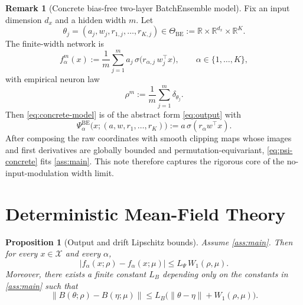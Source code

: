 \documentclass[11pt]{article}
\newtheorem{proposition}[theorem]{Proposition}
\theoremstyle{definition}
\newtheorem{remark}[theorem]{Remark}
\newcommand{\R}{\mathbb{R}}
\newcommand{\W}{W_1}
\begin{document}
\begin{remark}[Concrete bias-free two-layer BatchEnsemble model]
\label{rem:concrete}
Fix an input dimension $d_x$ and a hidden width $m$. Let
\[
  \theta_j=(a_j,w_j,r_{1,j},\dots,r_{K,j})
  \in
  \Theta_{\mathrm{BE}}
  :=
  \R\times\R^{d_x}\times\R^K.
\]
The finite-width network is
\begin{equation}
  f_\alpha^m(x)
  :=
  \frac1m\sum_{j=1}^m
  a_j\,\sigma\!\bigl(r_{\alpha,j}\,w_j^\top x\bigr),
  \qquad
  \alpha\in\{1,\dots,K\},
  \label{eq:concrete-model}
\end{equation}
with empirical neuron law
\[
  \rho^m:=\frac1m\sum_{j=1}^m\delta_{\theta_j}.
\]
Then \eqref{eq:concrete-model} is of the abstract form \eqref{eq:output} with
\begin{equation}
  \Psi_\alpha^{\mathrm{BE}}
  \bigl(x;(a,w,r_1,\dots,r_K)\bigr)
  :=
  a\,\sigma(r_\alpha w^\top x).
  \label{eq:psi-concrete}
\end{equation}
After composing the raw coordinates with smooth clipping maps whose images and
first derivatives are globally bounded and permutation-equivariant,
\eqref{eq:psi-concrete} fits \cref{ass:main}. This note therefore captures the
rigorous core of the no-input-modulation width limit.
\end{remark}

\section{Deterministic Mean-Field Theory}

\begin{proposition}[Output and drift Lipschitz bounds]
\label{prop:lipschitz}
Assume \cref{ass:main}. Then for every $x\in\mathcal X$ and every $\alpha$,
\begin{equation}
  |f_\alpha(x;\rho)-f_\alpha(x;\mu)|
  \le
  L_\Psi\,\W(\rho,\mu).
  \label{eq:out-lip}
\end{equation}
Moreover, there exists a finite constant $L_B$ depending only on the constants
in \cref{ass:main} such that
\begin{equation}
  \|B(\theta;\rho)-B(\eta;\mu)\|
  \le
  L_B\bigl(\|\theta-\eta\|+\W(\rho,\mu)\bigr).
  \label{eq:B-lip}
\end{equation}
\end{proposition}
\end{document}
